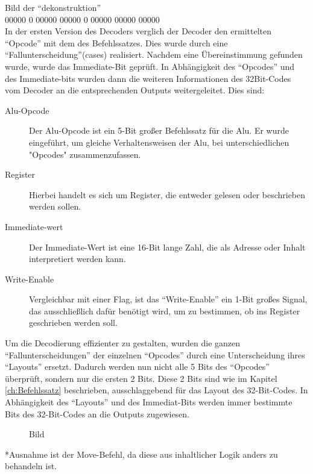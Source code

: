 \documentclass[paper=a4,fontsize=12pt,twocolumn]{scrreprt}
\begin{document}
Bild der \enquote{dekonstruktion}
\\
 00000  0  00000  00000   0 00000 00000 00000
\\
In der ersten Version des Decoders verglich der Decoder den ermittelten \enquote{Opcode} mit dem des Befehlssatzes.
Dies wurde durch eine \enquote{Fallunterscheidung}(cases) realisiert. Nachdem eine Übereinstimmung gefunden wurde, wurde das Immediate-Bit geprüft.
In Abhängigkeit des \enquote{Opcodes} und des Immediate-bits wurden dann die weiteren Informationen des 32Bit-Codes vom Decoder an die entsprechenden Outputs weitergeleitet. 
Dies sind:

\begin{description}
 \item [Alu-Opcode]
 Der Alu-Opcode ist ein 5-Bit großer Befehlssatz für die Alu.
 Er wurde eingeführt, um gleiche Verhaltensweisen der Alu, bei unterschiedlichen "Opcodes" zusammenzufassen.

\item [Register]
 Hierbei handelt es sich um Register, die entweder gelesen oder beschrieben werden sollen.

\item [Immediate-wert]
Der Immediate-Wert ist eine 16-Bit lange Zahl, die als Adresse oder Inhalt interpretiert werden kann.

\item [Write-Enable]
 Vergleichbar mit einer Flag, ist das \enquote{Write-Enable} ein 1-Bit großes Signal, das ausschließlich dafür benötigt wird, um zu bestimmen, ob ins Register geschrieben werden soll.
\end{description}

Um die Decodierung effizienter zu gestalten, wurden die ganzen \enquote{Fallunterscheidungen} der einzelnen \enquote{Opcodes} durch eine Unterscheidung ihres \enquote{Layouts} ersetzt.
Dadurch werden nun nicht alle 5 Bits des \enquote{Opcodes} überprüft, sondern nur die ersten 2 Bits.
Diese 2 Bits sind wie im Kapitel \ref{ch:Befehlssatz} beschrieben, ausschlaggebend für das Layout des 32-Bit-Codes.
In Abhängigkeit des \enquote{Layouts} und des Immediat-Bits werden immer bestimmte Bits des 32-Bit-Codes an die Outputs zugewiesen.


\begin{figure}[h]
\centering
\caption{Bild}
\end{figure}

*Ausnahme ist der Move-Befehl, da diese aus inhaltlicher Logik anders zu behandeln ist.
\end{document}
